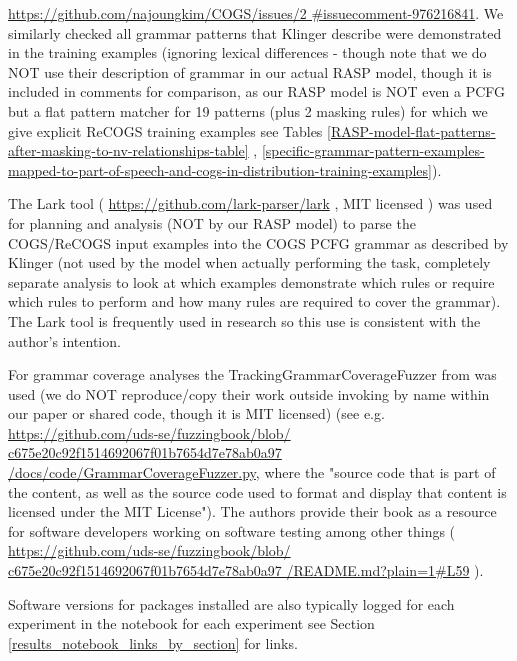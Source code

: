 \documentclass[11pt]{article}
\begin{document}
\href{https://github.com/najoungkim/COGS/issues/2\#issuecomment-976216841}{https://github.com/najoungkim/COGS/issues/2
\#issuecomment-976216841}.
We similarly checked all grammar patterns that Klinger describe were demonstrated in the training examples  (ignoring lexical differences - though note that we do NOT use their description of grammar in our actual RASP model, though it is included in comments for comparison, as our RASP model is NOT even a PCFG but a flat pattern matcher for 19 patterns (plus 2 masking rules) for which we give explicit ReCOGS training examples see Tables \ref{RASP-model-flat-patterns-after-masking-to-nv-relationships-table} , \ref{specific-grammar-pattern-examples-mapped-to-part-of-speech-and-cogs-in-distribution-training-examples}). 

The Lark tool ( \href{https://github.com/lark-parser/lark}{https://github.com/lark-parser/lark} , MIT licensed ) was used for planning and analysis (NOT by our RASP model) to parse the COGS/ReCOGS input examples into the COGS PCFG grammar as described by Klinger (not used by the model when actually performing the task, completely separate analysis to look at which examples demonstrate which rules or require which rules to perform and how many rules are required to cover the grammar). The Lark tool is frequently used in research so this use is consistent with the author's intention.

For grammar coverage analyses the TrackingGrammarCoverageFuzzer from \cite{fuzzingbook2023:GrammarCoverageFuzzer} was used (we do NOT reproduce/copy their work outside invoking by name within our paper or shared code, though it is MIT licensed) (see e.g. \href{https://github.com/uds-se/fuzzingbook/blob/c675e20c92f1514692067f01b7654d7e78ab0a97/docs/code/GrammarCoverageFuzzer.py}{https://github.com/uds-se/fuzzingbook/blob/
c675e20c92f1514692067f01b7654d7e78ab0a97
/docs/code/GrammarCoverageFuzzer.py}, where the "source code that is part of the content, as well as the source code used to format and display that content is licensed under the MIT License"). The authors \cite{fuzzingbook2023:GrammarCoverageFuzzer} provide their book as a resource for software developers working on software testing among other things ( \href{https://github.com/uds-se/fuzzingbook/blob/c675e20c92f1514692067f01b7654d7e78ab0a97/README.md?plain=1#L59}{https://github.com/uds-se/fuzzingbook/blob/
c675e20c92f1514692067f01b7654d7e78ab0a97
/README.md?plain=1\#L59} ).

Software versions for packages installed are also typically logged for each experiment in the notebook for each experiment see Section \ref{results_notebook_links_by_section} for links.
\end{document}
